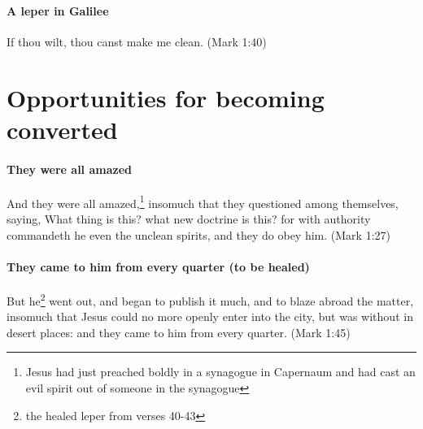 \paragraph{A leper in Galilee}
If thou wilt, thou canst make me clean. (Mark 1:40)

\section{Opportunities for becoming converted}

\paragraph{They were all amazed}
And they were all amazed,\footnote{Jesus had just preached boldly in a synagogue in Capernaum and had cast an evil spirit out of someone in the synagogue} insomuch that they questioned among themselves, saying, What thing is this? what new doctrine is this? for with authority commandeth he even the unclean spirits, and they do obey him. (Mark 1:27)

\paragraph{They came to him from every quarter (to be healed)}
But he\footnote{the healed leper from verses 40-43} went out, and began to publish it much, and to blaze abroad the matter, insomuch that Jesus could no more openly enter into the city, but was without in desert places: and they came to him from every quarter. (Mark 1:45)
